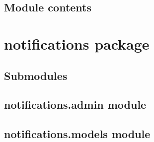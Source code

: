 \documentclass[letterpaper,10pt,english]{sphinxmanual}
\begin{document}

\begin{fulllineitems}
\label{messages:messages.views.messages_list_no_read}
\end{fulllineitems}


\begin{fulllineitems}
\label{messages:messages.views.messages_list_read}
\end{fulllineitems}


\begin{fulllineitems}
\label{messages:messages.views.new_message}
\end{fulllineitems}



\subsection{Module contents}
\label{messages:module-messages}\label{messages:module-contents}

\section{notifications package}
\label{notifications::doc}\label{notifications:notifications-package}

\subsection{Submodules}
\label{notifications:submodules}

\subsection{notifications.admin module}
\label{notifications:notifications-admin-module}\label{notifications:module-notifications.admin}

\subsection{notifications.models module}
\label{notifications:module-notifications.models}\label{notifications:notifications-models-module}
\end{document}
